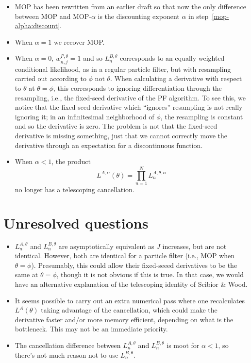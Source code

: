 \documentclass[12p]{article}
\begin{document}
\begin{itemize}
\item MOP has been rewritten from an earlier draft so that now the only difference between MOP and MOP-$\alpha$ is the discounting exponent $\alpha$ in step~\ref{mop-alpha:discount}.
\item When $\alpha=1$ we recover MOP.
\item When $\alpha=0$, $w^{P,\theta}_{n,j}=1$ and so $L^{B,\theta}_n$ corresponds to an equally weighted conditional likelihood, as in a regular particle filter, but with resampling carried out according to $\phi$ not $\theta$.
  When calculating a derivative with respect to $\theta$ at $\theta=\phi$, this corresponds to ignoring differentiation through the resampling, i.e., the fixed-seed derivative of the PF algorithm.
  To see this, we notice that the fixed seed derivative which ``ignores'' resampling is not really ignoring it; in an infinitesimal neighborhood of $\phi$, the resampling is constant and so the derivative is zero.
  The problem is not that the fixed-seed derivative is missing something, just that we cannot correctly move the derivative through an expectation for a discontinuous function.
\item When $\alpha < 1$, the product
\[
  L^{A,\alpha}(\theta)=\prod_{n=1}^N L^{A,\theta,\alpha}_n
\]
no longer has a telescoping cancellation. 
\end{itemize}

\section{Unresolved questions}

\begin{itemize}
\item $L^{A,\theta}_n$ and $L^{B,\theta}_n$ are asymptotically equivalent as $J$ increases, but are not identical.
  However, both are identical for a particle filter (i.e., MOP when $\theta=\phi$).
  Presumably, this could allow their fixed-seeed derivatives to be the same at $\theta=\phi$, though it is not obvious if this is true.
  In that case, we would have an alternative explanation of the telescoping identity of Scibior \& Wood.
 
\item It seems possible to carry out an extra numerical pass where one recalculates $L^A(\theta)$ taking advantage of the cancellation, which could make the derivative faster and/or more memory efficient, depending on what is the bottleneck. This may not be an immediate priority.

  \item The cancellation difference between  $L^{A,\theta}_n$ and $L^{B,\theta}_n$ is moot for $\alpha<1$, so there's not much reason not to use $L^{B,\theta}_n$.
 
\end{itemize}
\end{document}
